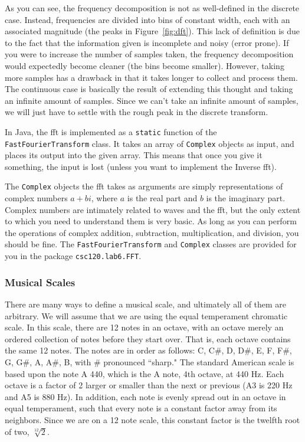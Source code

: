 As you can see, the frequency decomposition is not as well-defined in the discrete case.
Instead, frequencies are divided into bins of constant width, each with an associated magnitude (the peaks in Figure~\ref{fig:dft}).
This lack of definition is due to the fact that the information given is incomplete and noisy (error prone).
If you were to increase the number of samples taken, the frequency decomposition would expectedly become cleaner (the bins become smaller).
However, taking more samples has a drawback in that it takes longer to collect and process them.
The continuous case is basically the result of extending this thought and taking an infinite amount of samples.
Since we can't take an infinite amount of samples, we will just have to settle with the rough peak in the discrete transform.

In Java, the \ac{fft} is implemented as a \verb=static= function of the {\tt FastFourierTransform} class.
It takes an array of \verb=Complex= objects as input, and places its output into the given array.
This means that once you give it something, the input is lost (unless you want to implement the Inverse \ac{fft}).

The \verb=Complex= objects the \ac{fft} takes as arguments are simply representations of complex numbers $a+bi$, where $a$ is the real part and $b$ is the imaginary part.
Complex numbers are intimately related to waves and the \ac{fft}, but the only extent to which you need to understand them is very basic.
As long as you can perform the operations of complex addition, subtraction, multiplication, and division, you should be fine.
The \verb=FastFourierTransform= and \verb=Complex= classes are provided for you in the package {\tt csc120.lab6.FFT}.

\subsubsection{Musical Scales}
There are many ways to define a musical scale, and ultimately all of them are arbitrary.
We will assume that we are using the equal temperament chromatic scale.
In this scale, there are 12 notes in an octave, with an octave merely an ordered collection of notes before they start over.
That is, each octave contains the same 12 notes.
The notes are in order as follows: C, C\#, D, D\#, E, F, F\#, G, G\#, A, A\#, B, with \# pronounced ``sharp."
The standard American scale is based upon the note A 440, which is the A note, 4th octave, at 440 Hz.
Each octave is a factor of 2 larger or smaller than the next or previous (A3 is 220 Hz and A5 is 880 Hz).
In addition, each note is evenly spread out in an octave in equal temperament, such that every note is a constant factor away from its neighbors.
Since we are on a 12 note scale, this constant factor is the twelfth root of two, $ \sqrt[12]{2}$.

